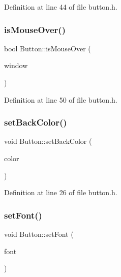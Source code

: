 Definition at line 44 of file button.\+h.

\mbox{\label{class_button_a34779d5dfdc96291a25454975c14e2b2}} 
\subsubsection{\texorpdfstring{is\+Mouse\+Over()}{isMouseOver()}}
{\footnotesize\ttfamily bool Button\+::is\+Mouse\+Over (\begin{DoxyParamCaption}\item[{sf\+::\+Render\+Window \&}]{window }\end{DoxyParamCaption})\hspace{0.3cm}{\ttfamily [inline]}}



Definition at line 50 of file button.\+h.

\mbox{\label{class_button_aaebeadc6fedd71472ef452302278de44}} 
\subsubsection{\texorpdfstring{set\+Back\+Color()}{setBackColor()}}
{\footnotesize\ttfamily void Button\+::set\+Back\+Color (\begin{DoxyParamCaption}\item[{sf\+::\+Color}]{color }\end{DoxyParamCaption})\hspace{0.3cm}{\ttfamily [inline]}}



Definition at line 26 of file button.\+h.

\mbox{\label{class_button_a155eee48a55f34915319d21460ce5955}} 
\subsubsection{\texorpdfstring{set\+Font()}{setFont()}}
{\footnotesize\ttfamily void Button\+::set\+Font (\begin{DoxyParamCaption}\item[{sf\+::\+Font \&}]{font }\end{DoxyParamCaption})\hspace{0.3cm}{\ttfamily [inline]}}



